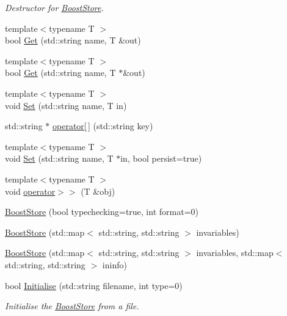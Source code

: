 \begin{DoxyCompactItemize}
\begin{DoxyCompactList}\small\item\em Destructor for \hyperlink{classBoostStore}{Boost\-Store}. \end{DoxyCompactList}\item 
{\footnotesize template$<$typename T $>$ }\\bool \hyperlink{classBoostStore_aaf269e40778672ed68224377b5e90fa9}{Get} (std\-::string name, T \&out)
\item 
{\footnotesize template$<$typename T $>$ }\\bool \hyperlink{classBoostStore_a7e2496fd31eed43a84eea9563ecf7f86}{Get} (std\-::string name, T $\ast$\&out)
\item 
{\footnotesize template$<$typename T $>$ }\\void \hyperlink{classBoostStore_a94e4f0b1d996488538efc09b831cd1a6}{Set} (std\-::string name, T in)
\item 
std\-::string $\ast$ \hyperlink{classBoostStore_aca2c7aed9a33e4022bb18c887d9dc42c}{operator\mbox{[}$\,$\mbox{]}} (std\-::string key)
\item 
{\footnotesize template$<$typename T $>$ }\\void \hyperlink{classBoostStore_a198a7f41e16912b439b85523f802ad0f}{Set} (std\-::string name, T $\ast$in, bool persist=true)
\item 
{\footnotesize template$<$typename T $>$ }\\void \hyperlink{classBoostStore_a4f1bce161785c396eb407adf3ab4491e}{operator$>$$>$} (T \&obj)
\item 
\hyperlink{classBoostStore_af359015c3ca44cd24fd915ec7bb008b4}{Boost\-Store} (bool typechecking=true, int format=0)
\item 
\hyperlink{classBoostStore_af114bcb7df59af05e5715af756771379}{Boost\-Store} (std\-::map$<$ std\-::string, std\-::string $>$ invariables)
\item 
\hyperlink{classBoostStore_a57b996f894624e61e8f57bf495f00c07}{Boost\-Store} (std\-::map$<$ std\-::string, std\-::string $>$ invariables, std\-::map$<$ std\-::string, std\-::string $>$ ininfo)
\item 
bool \hyperlink{classBoostStore_ada96e21cf2ffd6872dd1523ac6a5316b}{Initialise} (std\-::string filename, int type=0)
\begin{DoxyCompactList}\small\item\em Initialise the \hyperlink{classBoostStore}{Boost\-Store} from a file. \end{DoxyCompactList}\item 

\end{DoxyCompactItemize}
